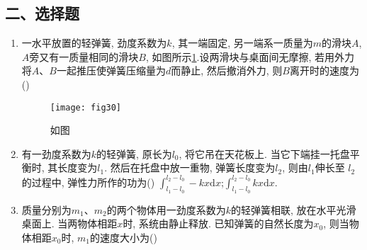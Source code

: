 \subsection*{二、选择题}
\begin{enumerate}
    \item 一水平放置的轻弹簧, 劲度系数为$k$, 其一端固定, 另一端系一质量为$m$的滑块$A$, 
    $A$旁又有一质量相同的滑块$B$, 如图所示\ref{fig:30}.设两滑块与桌面间无摩擦, 若用外力将$A$、$B$一起推压使弹簧压缩量为$d$而静止, 然后撤消外力, 则$B$离开时的速度为(\hspace{1pc})
    \begin{figure}[H]
        \centering
        \texttt{[image: fig30]}
            \caption{如图}\label{fig:30}
    \end{figure}
    \item 有一劲度系数为$k$的轻弹簧, 原长为$l_0$, 将它吊在天花板上. 当它下端挂一托盘平衡时, 其长度变为$l_1$. 然后在托盘中放一重物, 弹簧长度变为$l_2$, 则由$l_1$伸长至
    $l_2$的过程中, 弹性力所作的功为(\hspace{1pc})
    {$\displaystyle{\int_{l_1-l_0}^{l_2-l_0}-kx\mathrm{d}x}$;}{$\displaystyle{\int_{l_1-l_0}^{l_2-l_0}kx\mathrm{d}x}$.}
    \item 质量分别为$m_1$、$m_2$的两个物体用一劲度系数为$k$的轻弹簧相联, 放在水平光滑桌面上. 当两物体相距$x$时, 系统由静止释放. 已知弹簧的自然长度为$x_0$, 则当物体相距$x_0$时, $m_1$的速度大小为(\hspace{1pc})

\end{enumerate}
